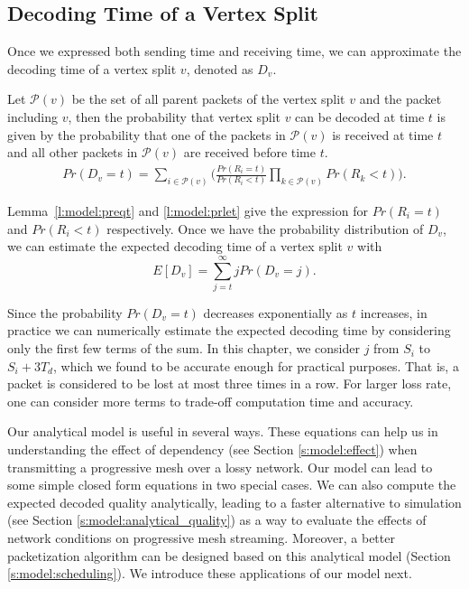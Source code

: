 \subsection{Decoding Time of a Vertex Split}

    Once we expressed both sending time and receiving time,
    we can approximate the decoding time of a vertex split $v$, denoted
    as $D_v$.

    Let $\mathcal{P}(v)$ be the set of
    all parent packets of the vertex split $v$ and the packet including $v$, then the
    probability that vertex split $v$ can be decoded at time $t$
    is given by the probability that one of the packets in $\mathcal{P}(v)$
    is received at time $t$ and all other packets in $\mathcal{P}(v)$
    are received before time $t$.
    \begin{eqnarray}
    \label{e:model:pdvt}
        Pr(D_v = t) = \sum_{i \in \mathcal{P}(v)}\big( \frac{Pr(R_i = t)}{Pr(R_i < t)} \prod_{k \in \mathcal{P}(v)} Pr(R_k < t)\big).
    \end{eqnarray}

    Lemma~\ref{l:model:preqt} and \ref{l:model:prlet} give the expression
    for $Pr(R_i=t)$ and $Pr(R_i<t)$ respectively.
    Once we have the probability distribution of $D_v$, we can
    estimate the expected decoding time of a vertex split $v$
    with
    \begin{equation}
    \label{e:model:e_et}
        E[D_v] = \sum_{j=t}^{\infty}jPr(D_v = j).
    \end{equation}

    Since the probability $Pr(D_v = t)$ decreases exponentially
    as $t$ increases, in practice we can numerically estimate the
    expected decoding time by considering only the first few
    terms of the sum.  In this chapter, we consider $j$ from $S_i$ to $S_i + 3T_d$,
    which we found to be accurate enough for practical purposes.
    That is,
    a packet is considered to be lost at most three times in a row.
    For larger loss rate, one can consider more terms to trade-off
    computation time and accuracy.


    Our analytical model is useful in several ways.  
    These equations can help us in understanding the effect of dependency (see Section \ref{s:model:effect}) when transmitting 
    a progressive mesh over a lossy network.  Our model can lead to some simple closed form equations in two special cases.  
    We can also compute the expected decoded quality analytically, leading to a faster alternative to 
    simulation (see Section \ref{s:model:analytical_quality}) as a way to evaluate the effects of network conditions on
    progressive mesh streaming.
    Moreover, a better packetization algorithm can be designed based on this analytical model (Section \ref{s:model:scheduling}). 
    We introduce these applications of our model next.


